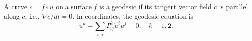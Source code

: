 A curve $c = f \circ u$ on a surface $f$ is a geodesic if its tangent vector field $\dot{c}$ is parallel along $c$, i.e., $\nabla \dot{c}/dt = 0$. In coordinates, the geodesic equation is
$$\ddot{u}^k + \sum_{i,j} \Gamma_{ij}^k \dot{u}^i \dot{u}^j = 0, \quad k = 1,2.$$